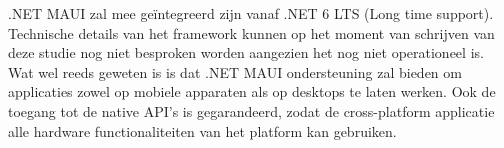 .NET MAUI zal mee geïntegreerd zijn vanaf .NET 6 LTS (Long time support). Technische details van het framework kunnen op het moment van schrijven van deze studie nog niet besproken worden aangezien het nog niet operationeel is. Wat wel reeds geweten is is dat .NET MAUI ondersteuning zal bieden om applicaties zowel op mobiele apparaten als op desktops te laten werken. Ook de toegang tot de native API's is gegarandeerd, zodat de cross-platform applicatie alle hardware functionaliteiten van het platform kan gebruiken. 



